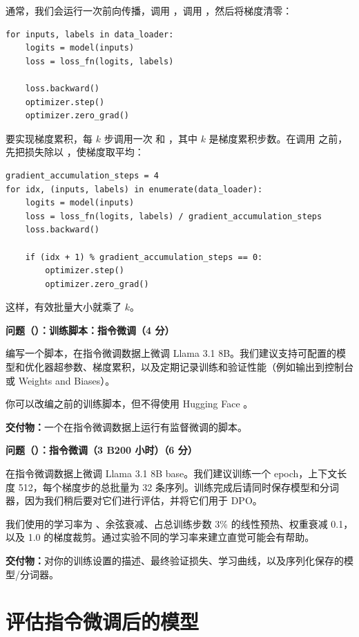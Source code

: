 通常，我们会运行一次前向传播，调用 ，调用 ，然后将梯度清零：

\begin{lstlisting}
for inputs, labels in data_loader:
    logits = model(inputs)
    loss = loss_fn(logits, labels)

    loss.backward()
    optimizer.step()
    optimizer.zero_grad()
\end{lstlisting}

要实现梯度累积，每 $k$ 步调用一次  和 ，其中 $k$ 是梯度累积步数。在调用  之前，先把损失除以 ，使梯度取平均：

\begin{lstlisting}
gradient_accumulation_steps = 4
for idx, (inputs, labels) in enumerate(data_loader):
    logits = model(inputs)
    loss = loss_fn(logits, labels) / gradient_accumulation_steps
    loss.backward()

    if (idx + 1) % gradient_accumulation_steps == 0:
        optimizer.step()
        optimizer.zero_grad()
\end{lstlisting}

这样，有效批量大小就乘了 $k$。

\medskip
\noindent\textbf{问题（）：训练脚本：指令微调（4 分）}
\medskip

编写一个脚本，在指令微调数据上微调 Llama 3.1 8B。我们建议支持可配置的模型和优化器超参数、梯度累积，以及定期记录训练和验证性能（例如输出到控制台或 Weights and Biases）。

你可以改编之前的训练脚本，但不得使用 Hugging Face 。

\textbf{交付物：}一个在指令微调数据上运行有监督微调的脚本。

\medskip
\noindent\textbf{问题（）：指令微调（3 B200 小时）（6 分）}
\medskip

在指令微调数据上微调 Llama 3.1 8B base。我们建议训练一个 epoch，上下文长度 512，每个梯度步的总批量为 32 条序列。训练完成后请同时保存模型和分词器，因为我们稍后要对它们进行评估，并将它们用于 DPO。

我们使用的学习率为 、余弦衰减、占总训练步数 3\% 的线性预热、权重衰减 0.1，以及 1.0 的梯度裁剪。通过实验不同的学习率来建立直觉可能会有帮助。

\textbf{交付物：}对你的训练设置的描述、最终验证损失、学习曲线，以及序列化保存的模型/分词器。

\section{评估指令微调后的模型}

